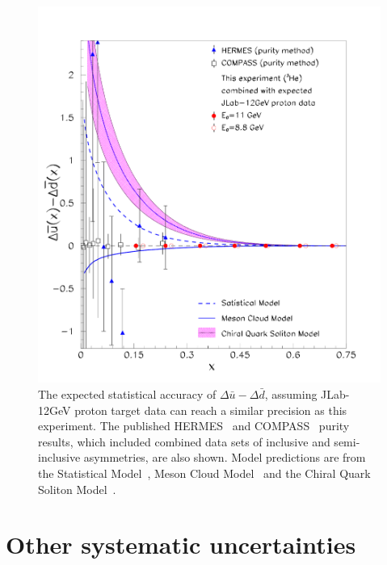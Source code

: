 \begin{figure}[htb]
\centering
   \includegraphics[width=0.8\linewidth]{figs_xj/polubdb_nox_053014.pdf}
\caption{\label{fig:dubdb1} 
The expected statistical accuracy of $\Delta \bar{u} - \Delta \bar{d}$, assuming JLab-12GeV proton target  data can reach a similar precision as this experiment. 
The published HERMES~\cite{Airapetian:2004zf} and COMPASS~\cite{Alekseev:2010ub}  purity 
results, which 
included combined data sets of inclusive and semi-inclusive asymmetries, are also shown.
Model predictions are from the Statistical Model~\protect\cite{bbs}, Meson Cloud Model~\protect\cite{cao} and 
the Chiral Quark Soliton
Model~\protect\cite{dressler}. 
}
\end{figure}

\section{Other systematic uncertainties}

